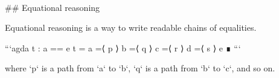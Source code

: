 {\begin{code}%
\>[0]\<%
\\
\>[0][@{}l@{\AgdaIndent{0}}]%
\>[2]\AgdaSpace{}%
\AgdaSymbol{\{}\AgdaSymbol{\}}\AgdaSpace{}%
\AgdaSymbol{(}\AgdaSpace{}%
\AgdaSymbol{:}\AgdaSpace{}%
\AgdaSpace{}%
\AgdaSymbol{)}\<%
\\
\>[2][@{}l@{\AgdaIndent{0}}]%
\>[4]\AgdaSymbol{:}\AgdaSpace{}%
\AgdaSymbol{(}\AgdaSpace{}%
\AgdaSymbol{:}\AgdaSpace{}%
\AgdaSpace{}%
\AgdaSymbol{)}\<%
\\
%
\>[4]\AgdaSpace{}%
\AgdaSymbol{(}\AgdaSpace{}%
\AgdaSymbol{:}\AgdaSpace{}%
\AgdaSpace{}%
\AgdaOperator{\AgdaDatatype{==}}\AgdaSpace{}%
\AgdaSymbol{)}\AgdaSpace{}%
\AgdaSymbol{(}\AgdaSpace{}%
\AgdaSymbol{:}\AgdaSpace{}%
\AgdaSymbol{)}\AgdaSpace{}%
\AgdaSymbol{(}\AgdaSpace{}%
\AgdaSymbol{:}\AgdaSpace{}%
\AgdaSymbol{)}\<%
\\
%
\>[4]\AgdaSpace{}%
\AgdaSpace{}%
\AgdaSymbol{(}\AgdaSpace{}%
\AgdaSymbol{)}\<%
\\
%
\>[2]\<%
\\
%
\>[2]\AgdaSpace{}%
\AgdaSymbol{:}\AgdaSpace{}%
\AgdaSpace{}%
\AgdaSymbol{\{}\AgdaSpace{}%
\AgdaSymbol{:}\AgdaSpace{}%
\AgdaSymbol{\}}\AgdaSpace{}%
\AgdaSpace{}%
\AgdaSpace{}%
\AgdaSpace{}%
\AgdaSpace{}%
\AgdaSpace{}%
\AgdaSpace{}%
\<%
\end{code}

## Equational reasoning

Equational reasoning is a way to write readable chains of equalities.

{%
```agda
  t : a == e
  t = a =⟨ p ⟩
      b =⟨ q ⟩
      c =⟨ r ⟩
      d =⟨ s ⟩
      e ∎
```
{%

where `p` is a path from `a` to `b`, `q` is a path from `b` to `c`, and so on.

\begin{code}%
\>[0]\<%
\\
\>[0][@{}l@{\AgdaIndent{0}}]%
\>[2]\<%
\\
%
\>[2]\AgdaSymbol{\{}\AgdaSpace{}%
\AgdaSymbol{:}\AgdaSpace{}%
\AgdaSpace{}%
\AgdaSymbol{\}}\<%
\\
%
\>[2]\<%
\end{code}

}}}
